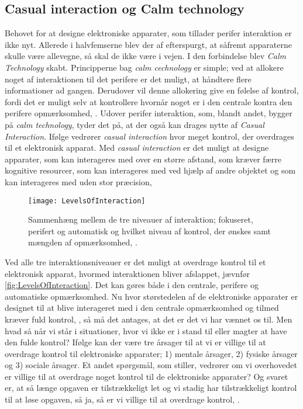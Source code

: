 \subsection{Casual interaction og Calm technology}
\label{CasualOgCalm}
%
Behovet for at designe elektroniske apparater, som tillader perifer interaktion er ikke nyt. Allerede i halvfemserne blev der af \textcite[s. 3]{PDF:TheComingAgeOfCalmTech} efterspurgt, at såfremt apparaterne skulle være allevegne, så skal de ikke være i vejen. I den forbindelse blev \textit{Calm Technology} skabt. Principperne bag \textit{calm cechnology} er simple; ved at allokere noget af interaktionen til det perifere er det muligt, at håndtere flere informationer ad gangen. Derudover vil denne allokering give en følelse af kontrol, fordi det er muligt selv at kontrollere hvornår noget er i den centrale kontra den perifere opmærksomhed, \parencite[s. 4]{PDF:TheComingAgeOfCalmTech}. Udover perifer interaktion, som, blandt andet, bygger på \textit{calm technology}, tyder det på, at der også kan drages nytte af \textit{Casual Interaction}. Ifølge \textcite[ss. 118-119]{PDF:PICasualInteractionKap6} vedrører \textit{casual interaction} hvor meget kontrol, der overdrages til et elektronisk apparat. Med \textit{casual interaction} er det muligt at designe apparater, som kan interageres med over en større afstand, som kræver færre kognitive resourcer, som kan interageres med ved hjælp af andre objektet og som kan interageres med uden stor præcision, \parencite[s. 128]{PDF:PICasualInteractionKap6}        
%
\begin{figure}[H]
	\centering
	\texttt{[image: LevelsOfInteraction]}
	\caption{Sammenhæng mellem de tre niveauer af interaktion; fokuseret, perifert og automatisk og hvilket niveau af kontrol, der ønskes samt mængden af opmærksomhed,  \parencite[s. 118]{PDF:PICasualInteractionKap6}.}
	\label{fig:LevelsOfInteraction}
\end{figure}
\noindent
%
Ved alle tre interaktionsniveauer er det muligt at overdrage kontrol til et elektronisk apparat, hvormed interaktionen bliver afslappet, jævnfør \autoref{fig:LevelsOfInteraction}. Det kan gøres både i den centrale, perifere og automatiske opmærksomhed. Nu hvor størstedelen af de elektroniske apparater er designet til at blive interageret med i den centrale opmærksomhed og tilmed kræver fuld kontrol, \parencite[s. 118]{PDF:PICasualInteractionKap6}, så må det antages, at det er det vi har vænnet os til. Men hvad så når vi står i situationer, hvor vi ikke er i stand til eller magter at have den fulde kontrol? Ifølge \textcite[s. 123]{PDF:PICasualInteractionKap6} kan der være tre årsager til at vi er villige til at overdrage kontrol til elektroniske apparater; 1) mentale årsager, 2) fysiske årsager og 3) sociale årsager. Et andet spørgsmål, som \textcite[s. 124]{PDF:PICasualInteractionKap6} stiller, vedrører om vi overhovedet er villige til at overdrage noget kontrol til de elektroniske apparater? Og svaret er, at så længe opgaven er tilstrækkeligt let og vi stadig har tilstrækkeligt kontrol til at løse opgaven, så ja, så er vi villige til at overdrage kontrol, \parencite[s. 124]{PDF:PICasualInteractionKap6}.\blankline
